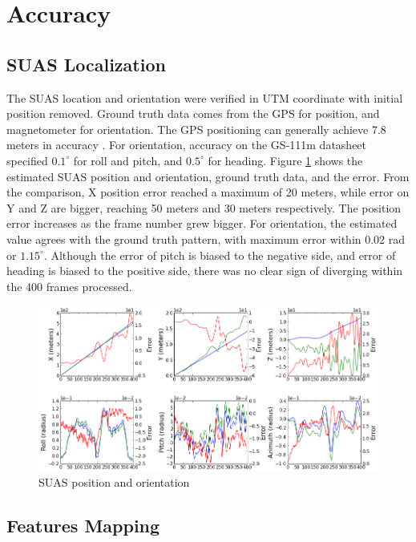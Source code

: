 \section{Accuracy}\label{sec:flight-accuracy}
\subsection{SUAS Localization}

The SUAS location and orientation were verified in UTM coordinate with
initial position removed. Ground truth data comes from the GPS for
position, and magnetometer for orientation. The GPS positioning can
generally achieve 7.8 meters in accuracy \cite{_gps_????}. For
orientation, accuracy on the GS-111m datasheet specified $0.1^{\circ}$
for roll and pitch, and $0.5^{\circ}$ for heading. Figure
\ref{fltfig:6} shows the estimated SUAS position and orientation,
ground truth data, and the error. From the comparison, X position
error reached a maximum of 20 meters, while error on Y and Z are
bigger, reaching 50 meters and 30 meters respectively. The position
error increases as the frame number grew bigger. For orientation, the
estimated value agrees with the ground truth pattern, with maximum
error within 0.02 rad or $1.15^{\circ}$. Although the error of pitch
is biased to the negative side, and error of heading is biased to the
positive side, there was no clear sign of diverging within the 400
frames processed.

\begin{figure}[h]
\centering
\includegraphics[width=12cm, keepaspectratio=true]
{./Figures/fltfig/cut1/Figure30.png}
\caption{SUAS position and orientation}
\label{fltfig:6}
\end{figure}
\FloatBarrier
\subsection{Features Mapping}\label{sec:accuracy_features}

